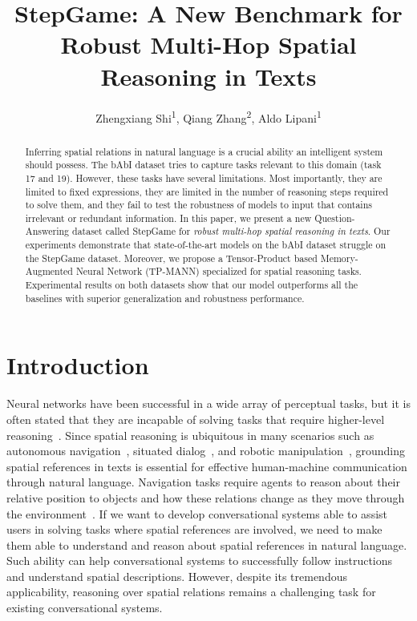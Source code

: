 \documentclass[letterpaper]{article} \usepackage{aaai22}  \usepackage{times}  \usepackage{helvet}  \usepackage{courier}  \usepackage[hyphens]{url}  \usepackage{graphicx} \urlstyle{rm} \def\UrlFont{\rm}  \usepackage{natbib}  \usepackage{caption} \DeclareCaptionStyle{ruled}{labelfont=normalfont,labelsep=colon,strut=off} \frenchspacing  \setlength{\pdfpagewidth}{8.5in}  \setlength{\pdfpageheight}{11in}  \usepackage{algorithm}
\title{StepGame: A New Benchmark for \\ Robust Multi-Hop Spatial Reasoning in Texts}
\author {
    Zhengxiang Shi\textsuperscript{\rm 1},
    Qiang Zhang\textsuperscript{\rm 2},
    Aldo Lipani\textsuperscript{\rm 1}
}
\begin{document}
\maketitle

\begin{abstract}
Inferring spatial relations in natural language is a crucial ability an intelligent system should possess. The bAbI dataset tries to capture tasks relevant to this domain (task 17 and 19). However, these tasks have several limitations. Most importantly, they are limited to fixed expressions, they are limited in the number of reasoning steps required to solve them, and they fail to test the robustness of models to input that contains irrelevant or redundant information. In this paper, we present a new Question-Answering dataset called StepGame for  \textit{robust multi-hop spatial reasoning in texts}. Our experiments demonstrate that state-of-the-art models on the bAbI dataset struggle on the StepGame dataset. Moreover, we propose a Tensor-Product based Memory-Augmented Neural Network (TP-MANN) specialized for spatial reasoning tasks. Experimental results on both datasets show that our model outperforms all the baselines with superior generalization and robustness performance.
 \end{abstract}


\section{Introduction}
Neural networks have been successful in a wide array of perceptual tasks, but it is often stated that they are incapable of solving tasks that require higher-level reasoning~\cite{ding2020object}. Since spatial reasoning is ubiquitous in many scenarios such as autonomous navigation~\cite{vogel2010learning}, situated dialog~\cite{kruijff2007situated}, and robotic manipulation~\cite{yang2020robust, landsiedel2017review},
grounding spatial references in texts is essential for effective human-machine communication through natural language. 
Navigation tasks require agents to reason about their relative position to objects and how these relations change as they move through the environment~\cite{chen2019touchdown}. 
If we want to develop conversational systems able to assist users in solving tasks where spatial references are involved, we need to make them able to understand and reason about spatial references in natural language.
Such ability can help conversational systems to successfully follow instructions and understand spatial descriptions. However,
despite its tremendous applicability, reasoning over spatial relations remains a challenging task for existing conversational systems.
\end{document}
